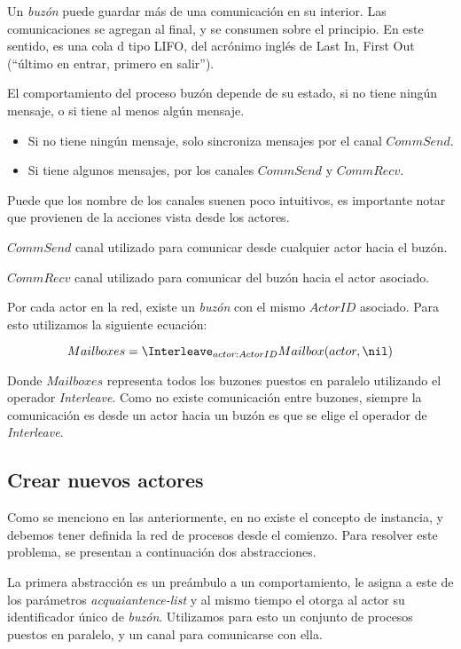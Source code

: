 Un \textit{buzón} puede guardar más de una comunicación en su interior. Las comunicaciones se agregan al final, y se consumen sobre el principio. En este sentido, es una cola d tipo LIFO, del acrónimo inglés de Last In, First Out (``último en entrar, primero en salir'').

El comportamiento del proceso buzón depende de su estado, si no tiene ningún mensaje, o si tiene al menos algún mensaje. 

\begin{itemize}
\item Si no tiene ningún mensaje, solo sincroniza mensajes por el canal $CommSend$.
\item Si tiene algunos mensajes, por los canales $CommSend$ y $CommRecv$.
\end{itemize}

Puede que los nombre de los canales suenen poco intuitivos, es importante notar que provienen de la acciones vista desde los actores.

\begin{description}
\item $CommSend$ canal utilizado para comunicar desde cualquier actor hacia el buzón.
\item $CommRecv$ canal utilizado para comunicar del buzón hacia el actor asociado.
\end{description}

Por cada actor en la red, existe un \textit{buzón} con el mismo $ActorID$ asociado. Para esto utilizamos la siguiente ecuación:

\[
Mailboxes = \Interleave_{ actor : ActorID } Mailbox(actor, \nil) 
\]

Donde $Mailboxes$ representa todos los buzones puestos en paralelo utilizando el operador \textit{Interleave}. Como no existe comunicación entre buzones, siempre la comunicación es desde un actor hacia un buzón es que se elige el operador de \textit{Interleave}.

\subsection{Crear nuevos actores}\label{modelo:crear}

Como se menciono en las anteriormente, en \CSP no existe el concepto de instancia, y debemos tener definida la red de procesos desde el comienzo. Para resolver este problema, se presentan a continuación dos abstracciones.

La primera abstracción es un preámbulo a un comportamiento, le asigna a este de los parámetros \textit{acquaiantence-list} y al mismo tiempo el otorga al actor su identificador único de \textit{buzón}. Utilizamos para esto un conjunto de procesos puestos en paralelo, y un canal para comunicarse con ella.

